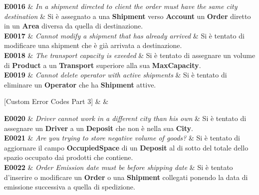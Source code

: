 {  \textbf{E0016} &
  {\footnotesize
    \textit{In a shipment directed to client the order must have the same city destination}
  } &
  {\footnotesize
    Si è assegnato a una \textbf{Shipment} verso \textbf{Account} un \textbf{Order} diretto in un \textbf{Area} diversa da quella di destinazione.} \\

  \textbf{E0017} &
  {\footnotesize
    \textit{Cannot modify a shipment that has already arrived} } &
  {\footnotesize
    Si è tentato di modificare una shipment che è già arrivata a destinazione.} \\

  \textbf{E0018} &
  {\footnotesize
    \textit{The transport capacity is exeeded} } &
  {\footnotesize
    Si è tentato di assegnare un volume di \textbf{Product} a un \textbf{Transport} superiore alla sua \textbf{MaxCapacity}.} \\

  \textbf{E0019} &
  {\footnotesize
    \textit{Cannot delete operator with active shipments} } &
  {\footnotesize
    Si è tentato di eliminare un \textbf{Operator} che ha \textbf{Shipment} attive.} \\

}

[Custom Error Codes Part 3]{ &  & }{

\textbf{E0020} &
{\footnotesize
  \textit{Driver cannot work in a different city than his own} } &
{\footnotesize
  Si è tentato di assegnare un \textbf{Driver} a un \textbf{Deposit} che non è nella sua \textbf{City}.} \\

\textbf{E0021} &
{\footnotesize
  \textit{Are you trying to store negative volume of goods?} } &
{\footnotesize
  Si è tentato di aggiornare il campo \textbf{OccupiedSpace} di un \textbf{Deposit} al di sotto del totale dello spazio occupato dai prodotti che contiene.} \\

\textbf{E0022} &
  \textit{Order Emission date must be before shipping date} & 
{\footnotesize
  Si è tentato d'inserire o modificare un \textbf{Order} o una \textbf{Shipment} collegati ponendo la data di emissione successiva a quella di spedizione.} \\

}

